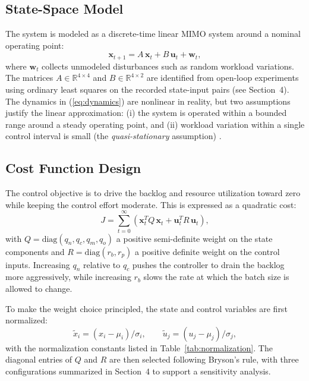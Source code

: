 \subsection{State-Space Model}

The system is modeled as a discrete-time linear MIMO system around a nominal operating point:
\begin{equation}
\mathbf{x}_{t+1} = A\,\mathbf{x}_t + B\,\mathbf{u}_t + \mathbf{w}_t,
\label{eq:dynamics}
\end{equation}
where $\mathbf{w}_t$ collects unmodeled disturbances such as random workload variations. The matrices $A \in \mathbb{R}^{4 \times 4}$ and $B \in \mathbb{R}^{4 \times 2}$ are identified from open-loop experiments using ordinary least squares on the recorded state-input pairs (see Section~4). The dynamics in (\ref{eq:dynamics}) are nonlinear in reality, but two assumptions justify the linear approximation: (i) the system is operated within a bounded range around a steady operating point, and (ii) workload variation within a single control interval is small (the \textit{quasi-stationary} assumption) \cite{ogata2010,hellerstein2004}.

\subsection{Cost Function Design}

The control objective is to drive the backlog and resource utilization toward zero while keeping the control effort moderate. This is expressed as a quadratic cost:
\begin{equation}
J = \sum_{t=0}^{\infty} \left( \mathbf{x}_t^{T} Q\,\mathbf{x}_t + \mathbf{u}_t^{T} R\,\mathbf{u}_t \right),
\label{eq:cost}
\end{equation}
with $Q = \text{diag}(q_n, q_c, q_m, q_o)$ a positive semi-definite weight on the state components and $R = \text{diag}(r_b, r_p)$ a positive definite weight on the control inputs. Increasing $q_n$ relative to $q_c$ pushes the controller to drain the backlog more aggressively, while increasing $r_b$ slows the rate at which the batch size is allowed to change.

To make the weight choice principled, the state and control variables are first normalized:
\begin{equation}
\tilde{x}_i = (x_i - \mu_i)/\sigma_i, \qquad \tilde{u}_j = (u_j - \mu_j)/\sigma_j,
\label{eq:normalize}
\end{equation}
with the normalization constants listed in Table~\ref{tab:normalization}. The diagonal entries of $Q$ and $R$ are then selected following Bryson's rule, with three configurations summarized in Section~4 to support a sensitivity analysis.

